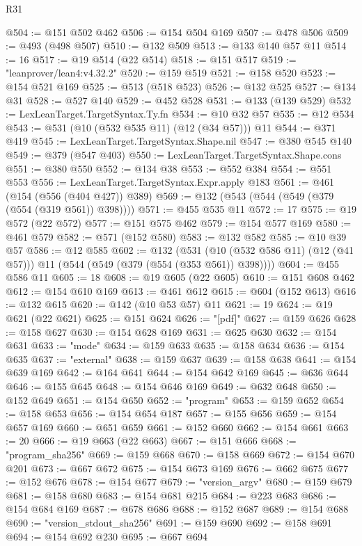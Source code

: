 \begin{lexlean}{R31}
\begin{coremodule}
@504 := @151 @502 @462
@506 := @154 @504 @169
@507 := @478 @506
@509 := @493 (@498 @507)
@510 := @132 @509
@513 := @133 @140 @57 @11
@514 := 16
@517 := @19 @514 (@22 @514)
@518 := @151 @517
@519 := "leanprover/lean4:v4.32.2"
@520 := @159 @519
@521 := @158 @520
@523 := @154 @521 @169
@525 := @513 (@518 @523)
@526 := @132 @525
@527 := @134 @31
@528 := @527 @140
@529 := @452 @528
@531 := @133 (@139 @529)
@532 := LexLeanTarget.TargetSyntax.Ty.fn
@534 := @10 @32 @57
@535 := @12 @534
@543 := @531 (@10 (@532 @535 @11) (@12 (@34 @57))) @11
@544 := @371 @419
@545 := LexLeanTarget.TargetSyntax.Shape.nil
@547 := @380 @545 @140
@549 := @379 (@547 @403)
@550 := LexLeanTarget.TargetSyntax.Shape.cons
@551 := @380 @550
@552 := @134 @38
@553 := @552 @384
@554 := @551 @553
@556 := LexLeanTarget.TargetSyntax.Expr.apply @183
@561 := @461 (@154 (@556 (@404 @427)) @389)
@569 := @132 (@543 (@544 (@549 (@379 (@554 (@319 @561)) @398))))
@571 := @455 @535 @11
@572 := 17
@575 := @19 @572 (@22 @572)
@577 := @151 @575 @462
@579 := @154 @577 @169
@580 := @461 @579
@582 := @571 (@152 @580)
@583 := @132 @582
@585 := @10 @39 @57
@586 := @12 @585
@602 := @132
    (@531 (@10 (@532 @586 @11) (@12 (@41 @57))) @11 (@544 (@549 (@379 (@554 (@353 @561)) @398))))
@604 := @455 @586 @11
@605 := 18
@608 := @19 @605 (@22 @605)
@610 := @151 @608 @462
@612 := @154 @610 @169
@613 := @461 @612
@615 := @604 (@152 @613)
@616 := @132 @615
@620 := @142 (@10 @53 @57) @11
@621 := 19
@624 := @19 @621 (@22 @621)
@625 := @151 @624
@626 := "[pdf]"
@627 := @159 @626
@628 := @158 @627
@630 := @154 @628 @169
@631 := @625 @630
@632 := @154 @631
@633 := "mode"
@634 := @159 @633
@635 := @158 @634
@636 := @154 @635
@637 := "external"
@638 := @159 @637
@639 := @158 @638
@641 := @154 @639 @169
@642 := @164 @641
@644 := @154 @642 @169
@645 := @636 @644
@646 := @155 @645
@648 := @154 @646 @169
@649 := @632 @648
@650 := @152 @649
@651 := @154 @650
@652 := "program"
@653 := @159 @652
@654 := @158 @653
@656 := @154 @654 @187
@657 := @155 @656
@659 := @154 @657 @169
@660 := @651 @659
@661 := @152 @660
@662 := @154 @661
@663 := 20
@666 := @19 @663 (@22 @663)
@667 := @151 @666
@668 := "program_sha256"
@669 := @159 @668
@670 := @158 @669
@672 := @154 @670 @201
@673 := @667 @672
@675 := @154 @673 @169
@676 := @662 @675
@677 := @152 @676
@678 := @154 @677
@679 := "version_argv"
@680 := @159 @679
@681 := @158 @680
@683 := @154 @681 @215
@684 := @223 @683
@686 := @154 @684 @169
@687 := @678 @686
@688 := @152 @687
@689 := @154 @688
@690 := "version_stdout_sha256"
@691 := @159 @690
@692 := @158 @691
@694 := @154 @692 @230
@695 := @667 @694

\end{coremodule}
\end{lexlean}
